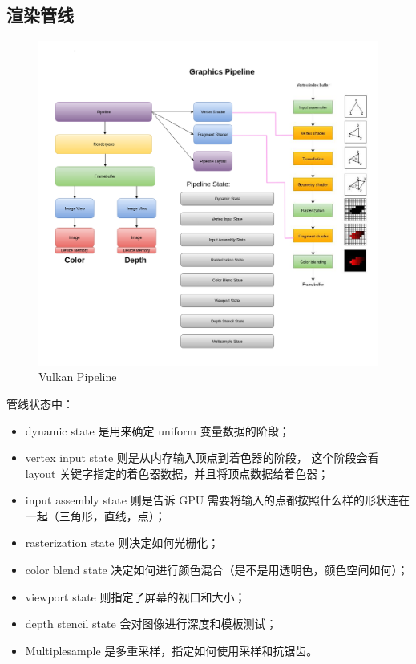 \documentclass[a4paper, 12pt]{ctexart}
\begin{document}
\subsection{渲染管线}
    \begin{figure}[htbp]
        \centering
        \includegraphics[scale = 0.4]{images/pipeline.png}
        \caption{Vulkan Pipeline}
    \end{figure}

    管线状态中：

    \begin{itemize}[itemindent=1em]
        \item dynamic state 是用来确定 uniform 变量数据的阶段；
        \item vertex input state 则是从内存输入顶点到着色器的阶段，
                这个阶段会看 layout 关键字指定的着色器数据，并且将顶点数据给着色器；
        \item input assembly state 则是告诉 GPU 需要将输入的点都按照什么样的形状连在一起（三角形，直线，点）；
        \item rasterization state 则决定如何光栅化；
        \item color blend state 决定如何进行颜色混合（是不是用透明色，颜色空间如何）；
        \item viewport state 则指定了屏幕的视口和大小；
        \item depth stencil state 会对图像进行深度和模板测试；
        \item Multiplesample 是多重采样，指定如何使用采样和抗锯齿。
    \end{itemize}
\end{document}
